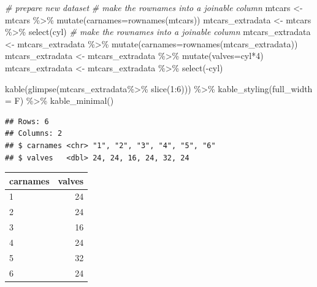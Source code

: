 \documentclass[
]{article}
\newenvironment{Shaded}{\begin{snugshade}}{\end{snugshade}}
\newcommand{\AttributeTok}[1]{\textcolor[rgb]{0.77,0.63,0.00}{#1}}
\newcommand{\CommentTok}[1]{\textcolor[rgb]{0.56,0.35,0.01}{\textit{#1}}}
\newcommand{\DecValTok}[1]{\textcolor[rgb]{0.00,0.00,0.81}{#1}}
\newcommand{\FunctionTok}[1]{\textcolor[rgb]{0.00,0.00,0.00}{#1}}
\newcommand{\NormalTok}[1]{#1}
\newcommand{\OtherTok}[1]{\textcolor[rgb]{0.56,0.35,0.01}{#1}}
\newcommand{\SpecialCharTok}[1]{\textcolor[rgb]{0.00,0.00,0.00}{#1}}
\begin{document}
\begin{Shaded}
\begin{Highlighting}[]
\CommentTok{\# prepare new dataset}
\CommentTok{\# make the rownames into a \textquotesingle{}joinable\textquotesingle{} column}
\NormalTok{mtcars }\OtherTok{\textless{}{-}}\NormalTok{ mtcars }\SpecialCharTok{\%\textgreater{}\%} \FunctionTok{mutate}\NormalTok{(}\AttributeTok{carnames=}\FunctionTok{rownames}\NormalTok{(mtcars)) }
\NormalTok{mtcars\_extradata }\OtherTok{\textless{}{-}}\NormalTok{ mtcars }\SpecialCharTok{\%\textgreater{}\%} \FunctionTok{select}\NormalTok{(cyl)}
\CommentTok{\# make the rownames into a \textquotesingle{}joinable\textquotesingle{} column}
\NormalTok{mtcars\_extradata }\OtherTok{\textless{}{-}}\NormalTok{ mtcars\_extradata }\SpecialCharTok{\%\textgreater{}\%}
\FunctionTok{mutate}\NormalTok{(}\AttributeTok{carnames=}\FunctionTok{rownames}\NormalTok{(mtcars\_extradata)) }
\NormalTok{mtcars\_extradata }\OtherTok{\textless{}{-}}\NormalTok{ mtcars\_extradata }\SpecialCharTok{\%\textgreater{}\%} \FunctionTok{mutate}\NormalTok{(}\AttributeTok{valves=}\NormalTok{cyl}\SpecialCharTok{*}\DecValTok{4}\NormalTok{)}
\NormalTok{mtcars\_extradata }\OtherTok{\textless{}{-}}\NormalTok{ mtcars\_extradata }\SpecialCharTok{\%\textgreater{}\%} \FunctionTok{select}\NormalTok{(}\SpecialCharTok{{-}}\NormalTok{cyl)}

\FunctionTok{kable}\NormalTok{(}\FunctionTok{glimpse}\NormalTok{(mtcars\_extradata}\SpecialCharTok{\%\textgreater{}\%} \FunctionTok{slice}\NormalTok{(}\DecValTok{1}\SpecialCharTok{:}\DecValTok{6}\NormalTok{))) }\SpecialCharTok{\%\textgreater{}\%}  
  \FunctionTok{kable\_styling}\NormalTok{(}\AttributeTok{full\_width =}\NormalTok{ F) }\SpecialCharTok{\%\textgreater{}\%}
  \FunctionTok{kable\_minimal}\NormalTok{()}
\end{Highlighting}
\end{Shaded}

\begin{verbatim}
## Rows: 6
## Columns: 2
## $ carnames <chr> "1", "2", "3", "4", "5", "6"
## $ valves   <dbl> 24, 24, 16, 24, 32, 24
\end{verbatim}

\begin{table}
\centering
\begin{tabular}{l|r}
\hline
carnames & valves\\
\hline
1 & 24\\
\hline
2 & 24\\
\hline
3 & 16\\
\hline
4 & 24\\
\hline
5 & 32\\
\hline
6 & 24\\
\hline
\end{tabular}
\end{table}
\end{document}
